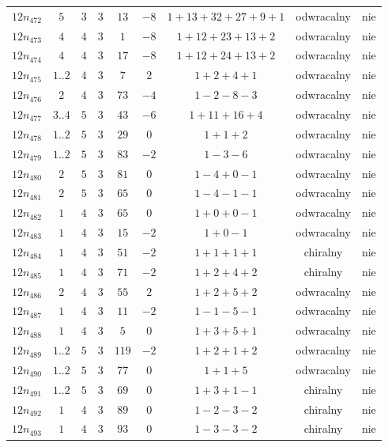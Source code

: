 \begin{longtable}{ccccccccc}
$12n_{472}$ & $5$ & $3$ & $3$ & $13$ & $-8$ & $1+13+32+27+9+1$ & odwracalny & nie \\
$12n_{473}$ & $4$ & $4$ & $3$ & $1$ & $-8$ & $1+12+23+13+2$ & odwracalny & nie \\
$12n_{474}$ & $4$ & $4$ & $3$ & $17$ & $-8$ & $1+12+24+13+2$ & odwracalny & nie \\
$12n_{475}$ & $1..2$ & $4$ & $3$ & $7$ & $2$ & $1+2+4+1$ & odwracalny & nie \\
$12n_{476}$ & $2$ & $4$ & $3$ & $73$ & $-4$ & $1-2-8-3$ & odwracalny & nie \\
$12n_{477}$ & $3..4$ & $5$ & $3$ & $43$ & $-6$ & $1+11+16+4$ & odwracalny & nie \\
$12n_{478}$ & $1..2$ & $5$ & $3$ & $29$ & $0$ & $1+1+2$ & odwracalny & nie \\
$12n_{479}$ & $1..2$ & $5$ & $3$ & $83$ & $-2$ & $1-3-6$ & odwracalny & nie \\
$12n_{480}$ & $2$ & $5$ & $3$ & $81$ & $0$ & $1-4+0-1$ & odwracalny & nie \\
$12n_{481}$ & $2$ & $5$ & $3$ & $65$ & $0$ & $1-4-1-1$ & odwracalny & nie \\
$12n_{482}$ & $1$ & $4$ & $3$ & $65$ & $0$ & $1+0+0-1$ & odwracalny & nie \\
$12n_{483}$ & $1$ & $4$ & $3$ & $15$ & $-2$ & $1+0-1$ & odwracalny & nie \\
$12n_{484}$ & $1$ & $4$ & $3$ & $51$ & $-2$ & $1+1+1+1$ & chiralny & nie \\
$12n_{485}$ & $1$ & $4$ & $3$ & $71$ & $-2$ & $1+2+4+2$ & chiralny & nie \\
$12n_{486}$ & $2$ & $4$ & $3$ & $55$ & $2$ & $1+2+5+2$ & odwracalny & nie \\
$12n_{487}$ & $1$ & $4$ & $3$ & $11$ & $-2$ & $1-1-5-1$ & odwracalny & nie \\
$12n_{488}$ & $1$ & $4$ & $3$ & $5$ & $0$ & $1+3+5+1$ & odwracalny & nie \\
$12n_{489}$ & $1..2$ & $5$ & $3$ & $119$ & $-2$ & $1+2+1+2$ & odwracalny & nie \\
$12n_{490}$ & $1..2$ & $5$ & $3$ & $77$ & $0$ & $1+1+5$ & odwracalny & nie \\
$12n_{491}$ & $1..2$ & $5$ & $3$ & $69$ & $0$ & $1+3+1-1$ & chiralny & nie \\
$12n_{492}$ & $1$ & $4$ & $3$ & $89$ & $0$ & $1-2-3-2$ & chiralny & nie \\
$12n_{493}$ & $1$ & $4$ & $3$ & $93$ & $0$ & $1-3-3-2$ & chiralny & nie \\

\end{longtable}
